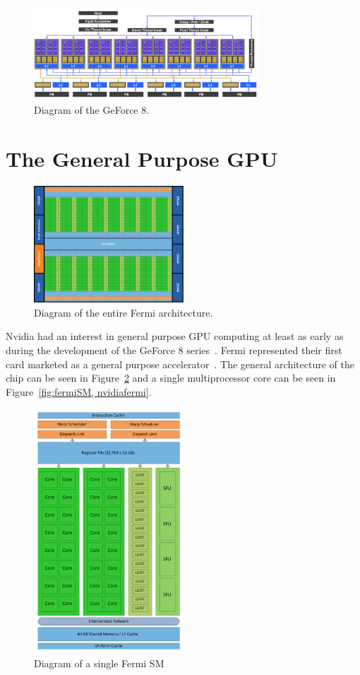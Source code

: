 \begin{figure}[h]
    \centering
    \includegraphics[width=0.75\textwidth]{assets/geforce8.png}
    \caption{Diagram of the GeForce 8.}
    \label{fig:geforce8}
\end{figure}

\section{The General Purpose GPU}


\begin{figure}[h]
    \centering
    \includegraphics[width=0.5\textwidth]{assets/fermi_architecture1.png}
    \caption{Diagram of the entire Fermi architecture.}
    \label{fig:fermi}
\end{figure}

Nvidia had an interest in general purpose GPU computing at least as early as during the development
of the GeForce 8 series~\cite{dally2021evolution}.
Fermi represented their first card marketed as a general purpose accelerator~\cite{nvidiafermi}.
The general architecture of the chip can be seen in Figure~\ref{fig:fermi} and a single 
multiprocessor core can be seen in Figure~\ref{fig:fermiSM, nvidiafermi}.


\begin{figure}[h]
    \centering
    \includegraphics[width=0.5\textwidth]{assets/Fermi.png}
    \caption{Diagram of a single Fermi SM} 
    \label{fig:fermiSM}
\end{figure}
